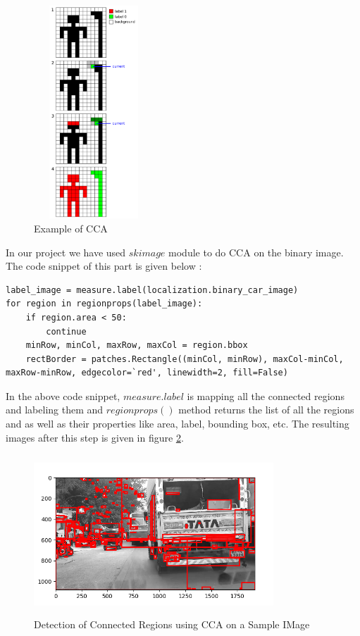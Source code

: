 \begin{itemize}
 \begin{figure}[!htb]
\centerline{\includegraphics[height=80mm,width=45mm]{img/rd5.png}}
\caption{Example of CCA \cite{b1}}
\label{fig5}
\end{figure}
 
 \par In our project we have used $skimage$ \cite{b14} module to do CCA on the binary image. The code snippet of this part is given below : 
 \begin{lstlisting}[caption=Connected component analysis]
label_image = measure.label(localization.binary_car_image)
for region in regionprops(label_image):
    if region.area < 50:
        continue
    minRow, minCol, maxRow, maxCol = region.bbox
    rectBorder = patches.Rectangle((minCol, minRow), maxCol-minCol, maxRow-minRow, edgecolor=`red', linewidth=2, fill=False)
 \end{lstlisting}
 In the above code snippet, $measure.label$ is mapping all the connected regions and labeling them and $regionprops()$ method returns the list of all the regions and as well as their properties like area, label, bounding box, etc. The resulting images after this step is given in figure \ref{fig6}.
\begin{figure}[!htb]
\centerline{\includegraphics[height=60mm,width=90mm]{img/rd6.png}}
\caption{Detection of Connected Regions using CCA on a Sample IMage}
\label{fig6}
\end{figure} 
 

\end{itemize}

